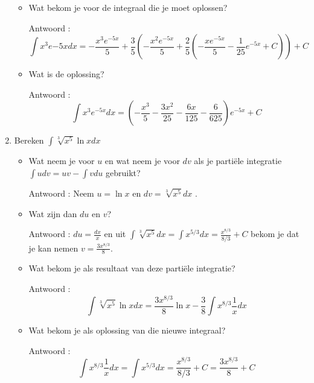 \begin{enumerate}
\begin{itemize}
		\item Wat bekom je voor de integraal die je moet oplossen?
		
		Antwoord : \begin{equation*}
		\int x^3e{-5x}dx = - \frac {x^3e^{-5x}}{5}+\frac {3}{5} \left(  - \frac {x^2e^{-5x}}{5}+\frac {2}{5} \left( - \frac {xe^{-5x}}{5}-\frac{1}{25}e^{-5x}+C  \right)   \right)+C
		\end{equation*}
		
		
		\item Wat is de oplossing?
		
		Antwoord : \begin{equation*}
		\int x^3e^{-5x}dx = \left( -\frac{x^3}{5}-\frac{3x^2}{25}-\frac{6x}{125}-\frac{6}{625}   \right)e^{-5x}+C
		\end{equation*}
		
	\end{itemize}
	
	\item Bereken $\int \sqrt[3]{x^5} \ln x dx$
	
	\begin{itemize}
		
		\item Wat neem je voor $u$ en wat neem je voor $dv$ als je parti\"ele integratie $\int udv = uv -\int vdu$ gebruikt?
		
		Antwoord : Neem $u= \ln x$ en $dv=\sqrt[3]{x^5}dx$ .
		
		\item Wat zijn dan $du$ en $v$?
		
		Antwoord : $du=\frac{dx}{x}$ en uit $\int \sqrt[3]{x^5}dx=\int x^{5/3}dx=\frac{x^{8/3}}{8/3}+C$ bekom je dat je kan nemen $v=\frac{3x^{8/3}}{8}$.
		
		\item Wat bekom je als resultaat van deze parti\"ele integratie?
		
		Antwoord : \begin{equation*}
		\int \sqrt[3]{x^5} \ln x dx=\frac{3x^{8/3}}{8} \ln x-\frac{3}{8}\int x^{8/3}\frac{1}{x}dx
		\end{equation*}
		
		\item Wat bekom je als oplossing van die nieuwe integraal?
		
		Antwoord : \begin{equation*}
		\int x^{8/3}\frac{1}{x}dx=\int x^{5/3}dx=\frac{x^{8/3}}{8/3}+C=\frac{3x^{8/3}}{8}+C
		\end{equation*}
		

\end{itemize}
\end{enumerate}
